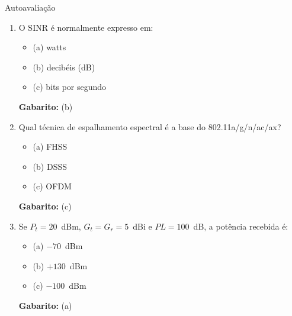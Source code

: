 \documentclass[aspectratio=169,11pt]{beamer}
\begin{document}
\begin{frame}{Autoavaliação}
  \begin{enumerate}
    \item O SINR é normalmente expresso em:
      \begin{itemize}
        \item (a) watts
        \item (b) decibéis (dB)
        \item (c) bits por segundo
      \end{itemize}
      \pause
      \textbf{Gabarito:} (b)

    \item Qual técnica de espalhamento espectral é a base do 802.11a/g/n/ac/ax?
      \begin{itemize}
        \item (a) FHSS
        \item (b) DSSS
        \item (c) OFDM
      \end{itemize}
      \pause
      \textbf{Gabarito:} (c)

    \item Se $P_t = 20$~dBm, $G_t = G_r = 5$~dBi e $PL = 100$~dB, a potência recebida é:
      \begin{itemize}
        \item (a) $-70$~dBm
        \item (b) $+130$~dBm
        \item (c) $-100$~dBm
      \end{itemize}
      \pause
      \textbf{Gabarito:} (a)
  \end{enumerate}
\end{frame}
\end{document}
